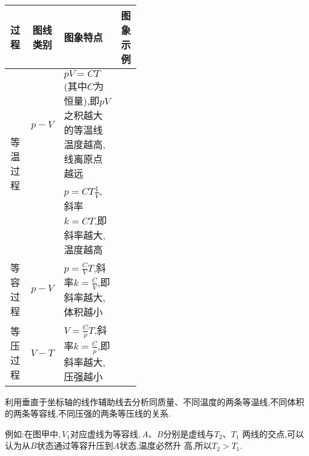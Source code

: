\begin{table}[h!]
\centering 
\begin{tabular}{|c|c|m{0.43\linewidth}|c|}
\hline 
过程 & 图线类别 & 图象特点 & 图象示例
\\
\hline
\multirow{2}{*}{等温过程} &$ p-V $ &$ pV=CT $(其中$ C $为恒量),即$ pV $之积越大的等温线温度越高,线离原点越远 & \begin{minipage}[h!]{0.2\linewidth}
\centering
\vspace{0.3em}

\vspace{0.3em}
\end{minipage} 
\\
\cline{2-4}
& &$ p=CT\frac{1}{V} $,斜率$ k=CT $,即斜率越大,温度越高 & \begin{minipage}[h!]{0.2\linewidth}
\centering
\vspace{0.3em}

\vspace{0.3em}
\end{minipage}
\\
\hline
等容过程 &$ p-V $ & $p = \frac { C } { V } T$,斜率$ k=\frac{C}{V} $,即斜率越大,体积越小 & \begin{minipage}[h!]{0.2\linewidth}
\centering
\vspace{0.3em}

\vspace{0.3em}
\end{minipage}
\\
\hline
等压过程 &$ V-T $ & $V = \frac { C } { p } T$,斜率$k = \frac { C } { p }$,即斜率越大,压强越小 & \begin{minipage}[h!]{0.2\linewidth}
\centering
\vspace{0.3em}

\vspace{0.3em}
\end{minipage}
\\
\hline
\end{tabular}
\end{table} 

利用垂直于坐标轴的线作辅助线去分析同质量、不同温度的两条等温线,不同体积的两条等容线,不同压强的两条等压线的关系.
\begin{figure}[h!]
\centering

\end{figure}

例如:在图甲中$ ,V_1 $对应虚线为等容线$ ,A $、$ B $分别是虚线与$ T_2 $、$ T_1 $ 两线的交点,可以认为从$ B $状态通过等容升压到$ A $状态,温度必然升
高,所以$ T_2>T_1 $.

